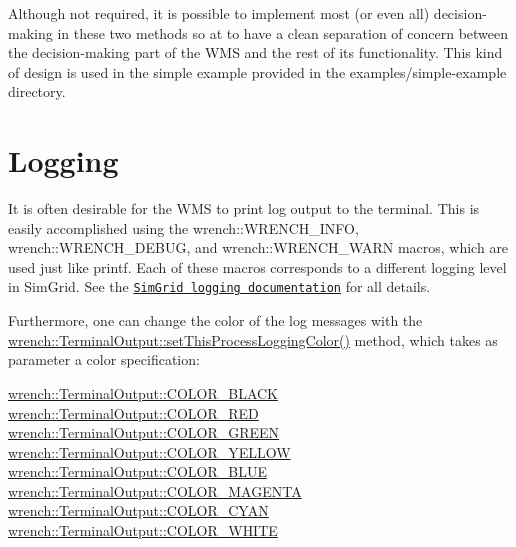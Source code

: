 Although not required, it is possible to implement most (or even all) decision-\/making in these two methods so at to have a clean separation of concern between the decision-\/making part of the W\+MS and the rest of its functionality. This kind of design is used in the simple example provided in the {\ttfamily examples/simple-\/example} directory.\hypertarget{wrench-101_wrench-101-WMS-logging}{}\section{Logging}\label{wrench-101_wrench-101-WMS-logging}
It is often desirable for the W\+MS to print log output to the terminal. This is easily accomplished using the {\ttfamily wrench\+::\+W\+R\+E\+N\+C\+H\+\_\+\+I\+N\+FO}, {\ttfamily wrench\+::\+W\+R\+E\+N\+C\+H\+\_\+\+D\+E\+B\+UG}, and {\ttfamily wrench\+::\+W\+R\+E\+N\+C\+H\+\_\+\+W\+A\+RN} macros, which are used just like {\ttfamily printf}. Each of these macros corresponds to a different logging level in Sim\+Grid. See the \href{http://simgrid.gforge.inria.fr/simgrid/latest/doc/outcomes_logs.html}{\tt Sim\+Grid logging documentation} for all details.

Furthermore, one can change the color of the log messages with the {\ttfamily \hyperlink{classwrench_1_1_terminal_output_a07c9d9aaefaf7d79fc2cafaa92162813}{wrench\+::\+Terminal\+Output\+::set\+This\+Process\+Logging\+Color()}} method, which takes as parameter a color specification\+:


\begin{DoxyCode}
\hyperlink{classwrench_1_1_terminal_output_a793daa5c24c3613b398f801a75bfa1e0a685e549985c21b52315120ecdbdedbd3}{wrench::TerminalOutput::COLOR\_BLACK}
\hyperlink{classwrench_1_1_terminal_output_a793daa5c24c3613b398f801a75bfa1e0aeaae512b70dc3fd7199ee0610e06b365}{wrench::TerminalOutput::COLOR\_RED}
\hyperlink{classwrench_1_1_terminal_output_a793daa5c24c3613b398f801a75bfa1e0a7fd5b987f631b43b631941d0955a9949}{wrench::TerminalOutput::COLOR\_GREEN}
\hyperlink{classwrench_1_1_terminal_output_a793daa5c24c3613b398f801a75bfa1e0aec7f1f1d23a5f370415d086d38980b43}{wrench::TerminalOutput::COLOR\_YELLOW}
\hyperlink{classwrench_1_1_terminal_output_a793daa5c24c3613b398f801a75bfa1e0a0fede0fa90e0ca54f914b8d897470709}{wrench::TerminalOutput::COLOR\_BLUE}
\hyperlink{classwrench_1_1_terminal_output_a793daa5c24c3613b398f801a75bfa1e0a792bd57a9fd44e1a9754b55c6df686a6}{wrench::TerminalOutput::COLOR\_MAGENTA}
\hyperlink{classwrench_1_1_terminal_output_a793daa5c24c3613b398f801a75bfa1e0aed9315672be90ad25a40e8f39a6313c4}{wrench::TerminalOutput::COLOR\_CYAN}
\hyperlink{classwrench_1_1_terminal_output_a793daa5c24c3613b398f801a75bfa1e0a745c6187163532ca681a89e925dbce69}{wrench::TerminalOutput::COLOR\_WHITE}
\end{DoxyCode}
 